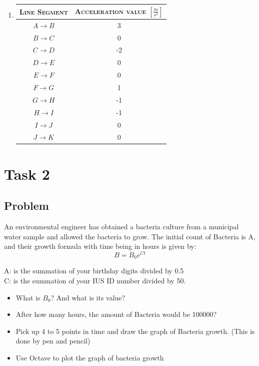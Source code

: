 \documentclass[a4paper, 10pt]{article}
\begin{document}
\begin{enumerate}
				\item 
					\vspace{5mm}
				{
					\centering
					\begin{tabular}{|c|c|}
						\hline \hline 
						\textsc{Line Segment} & \textsc{Acceleration value $\left[\frac{m}{s^2}\right]$} \\ \hline
						$A \rightarrow B$ & 3 \\ \hline
						$B \rightarrow C$ & 0 \\ \hline
						$C \rightarrow D$ & -2 \\ \hline
						$D \rightarrow E$ & 0 \\ \hline
						$E \rightarrow F$ & 0 \\ \hline
						$F \rightarrow G$ & 1 \\ \hline
						$G \rightarrow H$ & -1 \\ \hline
						$H \rightarrow I$ & -1 \\ \hline
						$I \rightarrow J$ & 0 \\ \hline
						$J \rightarrow K$ & 0 \\ \hline \hline
					\end{tabular}
					\par
				}
			\end{enumerate}
	\section{Task 2}
	
		\subsection{Problem}
			\noindent An environmental engineer has obtained a bacteria culture from a municipal water sample and allowed the bacteria to grow. The initial count of Bacteria is A, and their growth formula with time being in hours is given by: \[B = B_{0}e^{Ct}\]
			
			\noindent A: is the summation of your birthday digits divided by 0.5 \\
			\noindent C: is the summation of your IUS ID number divided by 50.
			
			\begin{itemize}
				\item What is $B_0$? And what is its value?
				\item After how many hours, the amount of Bacteria would be 100000?
				\item Pick up 4 to 5 points in time and draw the graph of Bacteria growth. (This is done by pen and pencil)
				\item Use Octave to plot the graph of bacteria growth 
			\end{itemize}
			\pagebreak
			
\end{document}
